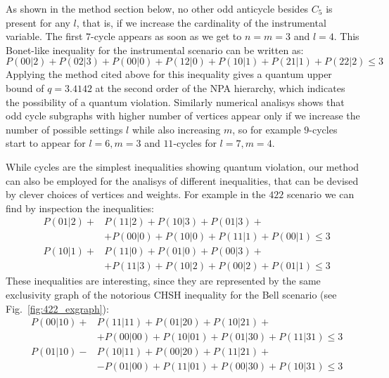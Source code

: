 \documentclass[letterpaper]{article}
\newcommand{\avg}[1]{\langle#1\rangle}
\begin{document}
As shown in the method section below, no other odd anticycle besides
$C_5$ is present for any $l$, that is, if we increase the cardinality of the
instrumental variable.
The first $7$-cycle appears as soon as we get to $n=m=3$ and $l=4$.
This Bonet-like inequality for the instrumental scenario can be written as:
\begin{equation}
    P(00|2) + P(02|3) + P(00|0) + P(12|0) + P(10|1) + P(21|1) + P(22|2) \le 3 
    \label{eq:c7_instrumental433}
\end{equation}
Applying the method cited above for this inequality gives a quantum upper bound
of $q = 3.4142$ at the second order of the NPA hierarchy, which indicates the
possibility of a quantum violation.
Similarly numerical analisys shows that odd cycle subgraphs with higher number
of vertices appear only if we increase the number of possible settings $l$ while
also increasing $m$, so for example $9$-cycles start to appear for $l=6, m=3$ 
and $11$-cycles for $l=7, m=4$.

While cycles are the simplest inequalities showing quantum violation, our method
can also be employed for the analisys of different inequalities, that can be 
devised by clever choices of vertices and weights. 
For example in the $422$ scenario we can find by inspection the inequalities:
\begin{align}
    &P(01|2) + &P(11|2) + P(10|3) + P(01|3) + \\
    &&+ P(00|0) + P(10|0) + P(11|1) + P(00|1) \le 3 \\
    &P(10|1) + &P(11|0) + P(01|0) + P(00|3) +\\
    &&+ P(11|3) + P(10|2) + P(00|2) + P(01|1) \le 3
    \label{eq:422_ineq}
\end{align}
These inequalities are interesting, since they are represented by the same
exclusivity graph of the notorious CHSH inequality for the Bell scenario (see
Fig.~\ref{fig:422_exgraph}):
\begin{align}
    &P(00|10) + &P(11|11) + P(01|20) + P(10|21) + \\
    &&+ P(00|00) + P(10|01) + P(01|30) + P(11|31) \le 3 \\
    &P(01|10) - &P(10|11) + P(00|20) + P(11|21) +\\
    &&- P(01|00) + P(11|01) + P(00|30) + P(10|31) \le 3
    \label{eq:422_ineq}
\end{align}
\end{document}
